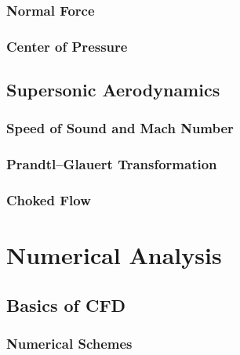 \documentclass[uplatex,dvipdfmx,a4paper,11pt]{report}
\numberwithin{equation}{chapter}
\begin{document}
\subsection{Normal Force}
\subsection{Center of Pressure}

\section{Supersonic Aerodynamics}
\subsection{Speed of Sound and Mach Number}

\subsection{Prandtl--Glauert Transformation}

\subsection{Choked Flow}


\chapter{Numerical Analysis}

\section{Basics of CFD}
\subsection{Numerical Schemes}
\end{document}
